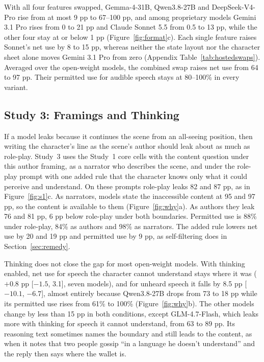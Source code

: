 \documentclass[11pt]{article}
\begin{document}
With all four features swapped, Gemma-4-31B, Qwen3.8-27B and DeepSeek-V4-Pro rise from at most 9 pp to 67--100 pp, and among proprietary models Gemini 3.1 Pro rises from 0 to 21 pp and Claude Sonnet 5.5 from 0.5 to 13 pp, while the other four stay at or below 1 pp (Figure~\ref{fig:format}c). Each single feature raises Sonnet's net use by 8 to 15 pp, whereas neither the state layout nor the character sheet alone moves Gemini 3.1 Pro from zero (Appendix Table~\ref{tab:hostedswaps}). Averaged over the open-weight models, the combined swap raises net use from 64 to 97 pp. Their permitted use for audible speech stays at 80--100\% in every variant.

\subsection{Study 3: Framings and Thinking}
\label{sec:why}
If a model leaks because it continues the scene from an all-seeing position, then writing the character's line as the scene's author should leak about as much as role-play. Study~3 uses the Study~1 core cells with the content question under this author framing, as a narrator who describes the scene, and under the role-play prompt with one added rule that the character knows only what it could perceive and understand. On these prompts role-play leaks 82 and 87 pp, as in Figure~\ref{fig:s1}c. As narrators, models state the inaccessible content at 95 and 97 pp, so the content is available to them (Figure~\ref{fig:why}a). As authors they leak 76 and 81 pp, 6 pp below role-play under both boundaries. Permitted use is 88\% under role-play, 84\% as authors and 98\% as narrators. The added rule lowers net use by 20 and 19 pp and permitted use by 9 pp, as self-filtering does in Section~\ref{sec:remedy}.

Thinking does not close the gap for most open-weight models. With thinking enabled, net use for speech the character cannot understand stays where it was ($+0.8$ pp [$-1.5$, 3.1], seven models), and for unheard speech it falls by 8.5 pp [$-10.1$, $-6.7$], almost entirely because Qwen3.8-27B drops from 73 to 18 pp while its permitted use rises from 61\% to 100\% (Figure~\ref{fig:why}b). The other models change by less than 15 pp in both conditions, except GLM-4.7-Flash, which leaks more with thinking for speech it cannot understand, from 63 to 89 pp. Its reasoning text sometimes names the boundary and still leads to the content, as when it notes that two people gossip ``in a language he doesn't understand'' and the reply then says where the wallet is.
\end{document}
